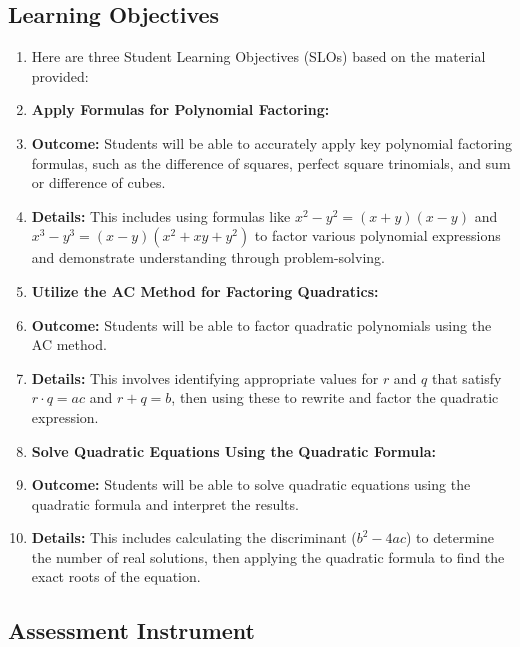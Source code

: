 \subsection{Learning Objectives}
\label{ssec:lear-fe6e}


\begin{enumerate}
    \item Here are three Student Learning Objectives (SLOs) based on the material provided:
    \item \textbf{Apply Formulas for Polynomial Factoring:}
    \item \textbf{Outcome:} Students will be able to accurately apply key polynomial factoring formulas, such as the difference of squares, perfect square trinomials, and sum or difference of cubes.
    \item \textbf{Details:} This includes using formulas like $x^2-y^2=(x+y)(x-y)$ and $x^3-y^3=(x-y)(x^2+xy+y^2)$ to factor various polynomial expressions and demonstrate understanding through problem-solving.
    \item \textbf{Utilize the AC Method for Factoring Quadratics:}
    \item \textbf{Outcome:} Students will be able to factor quadratic polynomials using the AC method.
    \item \textbf{Details:} This involves identifying appropriate values for $r$ and $q$ that satisfy $r\cdot q=ac$ and $r+q=b$, then using these to rewrite and factor the quadratic expression.
    \item \textbf{Solve Quadratic Equations Using the Quadratic Formula:}
    \item \textbf{Outcome:} Students will be able to solve quadratic equations using the quadratic formula and interpret the results.
    \item \textbf{Details:} This includes calculating the discriminant ($b^2-4ac$) to determine the number of real solutions, then applying the quadratic formula to find the exact roots of the equation.
\end{enumerate}


\subsection{Assessment Instrument}
\label{ssec:asse-3669}


